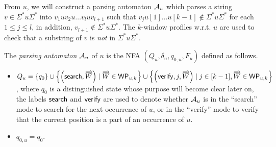From $u$, we will construct a parsing automaton $\mathcal{A}_u$ which parses a string $v \in \Sigma^\ast u \Sigma^\ast$ into $v_1 u v_2 u \dots v_l u v_{l+1}$ such that $v_j u[1] \dots u[k-1] \not \in \Sigma^\ast u \Sigma^\ast$ for each $1 \le j \le l$, in addition, $v_{l+1} \not \in \Sigma^\ast u \Sigma^\ast$. 
The $k$-window profiles w.r.t. $u$ are used to check that a substring of $v$ is \emph{not} in $\Sigma^\ast u \Sigma^\ast$.

\begin{definition}
The \emph{parsing automaton} $\mathcal{A}_u$ of $u$ is the NFA $(Q_u, \delta_u, q_{0,u}, F_u)$ defined as follows. 
\begin{itemize}
	\item  $Q_u =\left\{q_0 \right\} \cup \left\{ \left(\mathsf{search}, \overrightarrow{W} \right) \mid \overrightarrow{W} \in \mathsf{WP}_{u, k} \right\} \cup  \left\{ \left(\mathsf{verify}, j, \overrightarrow{W} \right) \mid j \in [k-1], \overrightarrow{W} \in \mathsf{WP}_{u,k} \right\}$, where $q_0$ is a distinguished state whose purpose will become clear later on,  the labels $\mathsf{search}$ and $\mathsf{verify}$ are used to denote whether $\mathcal{A}_u$ is in the ``search'' mode to search for the next occurrence of $u$, or in the ``verify'' mode to verify that the current position is a part of an occurrence of $u$.
	\item $q_{0,u}=q_0$.
	

\end{itemize}
\end{definition}
